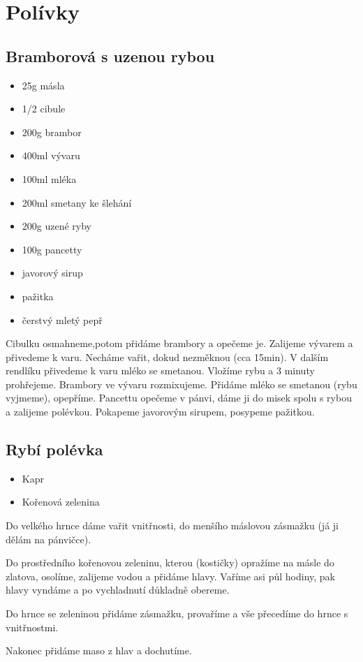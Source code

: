 \documentclass[10pt,a4paper]{article}
\newenvironment{myitemize}
{ \begin{itemize}
    \setlength{\itemsep}{0pt}
    \setlength{\parskip}{0pt}
    \setlength{\parsep}{0pt}     }
{ \end{itemize}                  }
\begin{document}
\pagebreak
\section{Polívky}
\subsection{Bramborová s uzenou rybou}
\begin{minipage}[t]{0,5\textwidth}
\begin{myitemize} 
\item 25g másla
\item 1/2 cibule
\item 200g brambor
\item 400ml vývaru
\item 100ml mléka
\item 200ml smetany ke šlehání
\item 200g uzené ryby
\item 100g pancetty
\item javorový sirup
\item pažitka
\item čerstvý mletý pepř
\end{myitemize}
\end{minipage}
\begin{minipage}[t]{0,5\textwidth}
Cibulku osmahneme,potom přidáme brambory a opečeme je. Zalijeme vývarem a přivedeme k varu. Necháme vařit, dokud nezměknou (cca 15min). V dalším rendlíku přivedeme k varu mléko se smetanou. Vložíme rybu a 3 minuty prohřejeme. Brambory ve vývaru rozmixujeme. Přidáme mléko se smetanou (rybu vyjmeme), opepříme. Pancettu opečeme v pánvi, dáme ji do misek spolu s rybou a zalijeme polévkou. Pokapeme javorovým sirupem, posypeme pažitkou.
\end{minipage}

\subsection{Rybí polévka}
\begin{minipage}[t]{0,5\textwidth}
\begin{myitemize} 
\item Kapr
\item Kořenová zelenina
\end{myitemize}
\end{minipage}
\begin{minipage}[t]{0,5\textwidth}
Do velkého hrnce dáme vařit vnitřnosti, do menšího máslovou zásmažku (já ji dělám na pánvičce).

Do prostředního kořenovou zeleninu, kterou (kostičky) opražíme na másle do zlatova, osolíme, zalijeme vodou a přidáme hlavy. Vaříme asi půl hodiny, pak hlavy vyndáme a po vychladnutí důkladně obereme. 

Do hrnce se zeleninou přidáme zásmažku, provaříme a vše přecedíme do hrnce s vnitřnostmi. 

Nakonec přidáme maso z hlav a dochutíme. 
\end{minipage}
\end{document}
